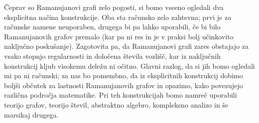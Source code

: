 Čeprav so Ramanujanovi grafi zelo pogosti, si bomo vseeno ogledali dva eksplicitna načina konstrukcije. Oba sta računsko zelo zahtevna; prvi je za računske namene neuporaben, drugega bi pa lahko uporabili, če bi bilo Ramanujanovih grafov premalo (kar pa ni res in je v praksi bolj učinkovito naključno poskušanje). Zagotovita pa, da Ramanujanovi grafi zares obstajajo za vsako stopnjo regularnosti in določena števila vozlišč, kar iz naključnih konstrukcij kljub visokemu deležu ni očitno. Glavni razlog, da si jih bomo ogledali mi pa ni računski; za nas bo pomembno, da iz eksplicitnih konstrukcij dobimo boljši občutek za lastnosti Ramanujanovih grafov in opazimo, kako povezujejo različna področja matematike. Pri teh konstrukcijah bomo namreč uporabili teorijo grafov, teorijo števil, abstraktno algebro, kompleksno analizo in še marsikaj drugega.

